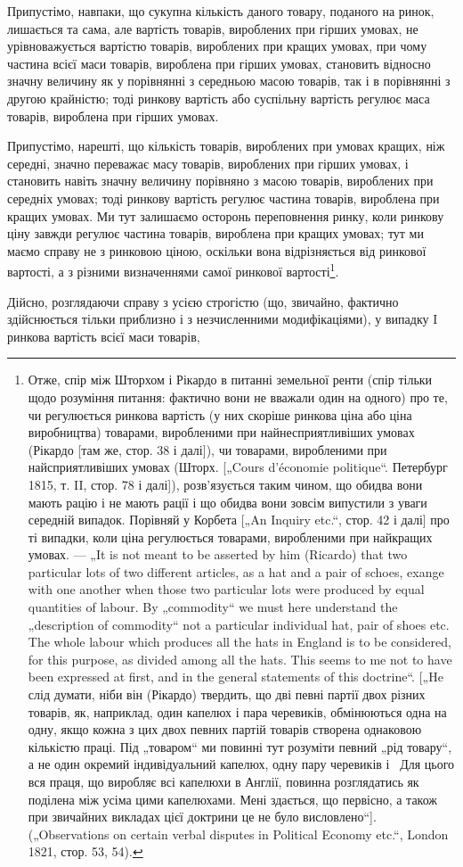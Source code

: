 Припустімо, навпаки, що сукупна кількість даного товару,
поданого на ринок, лишається та сама, але вартість товарів,
вироблених при гірших умовах, не урівноважується вартістю
товарів, вироблених при кращих умовах, при чому частина всієї
маси товарів, вироблена при гірших умовах, становить відносно
значну величину як у порівнянні з середньою масою товарів,
так і в порівнянні з другою крайністю; тоді ринкову вартість
або суспільну вартість регулює маса товарів, вироблена при
гірших умовах.

Припустімо, нарешті, що кількість товарів, вироблених при
умовах кращих, ніж середні, значно переважає масу товарів, вироблених при гірших умовах, і становить
навіть значну величину порівняно з масою товарів, вироблених при середніх умовах; тоді ринкову
вартість регулює частина товарів, вироблена при
кращих умовах. Ми тут залишаємо осторонь переповнення ринку,
коли ринкову ціну завжди регулює частина товарів, вироблена
при кращих умовах; тут ми маємо справу не з ринковою ціною,
оскільки вона відрізняється від ринкової вартості, а з різними
визначеннями самої ринкової вартості\footnote{
Отже, спір між Шторхом і Рікардо в питанні земельної ренти (спір
тільки щодо розуміння питання: фактично вони не вважали один на одного)
про те, чи регулюється ринкова вартість (у них скоріше ринкова ціна або
ціна виробництва) товарами, виробленими при найнесприятливіших умовах
(Рікардо [там же, стор. 38 і далі]), чи товарами, виробленими при найсприятливіших умовах (Шторх.
[„Cours d’économie politique“. Петербург 1815, т. II,
стор. 78 і далі]), розв’язується таким чином, що обидва вони мають рацію
і не мають рації і що обидва вони зовсім випустили з уваги середній випадок.
Порівняй у Корбета [„An Inquiry etc.“, стор. 42 і далі] про ті випадки, коли
ціна регулюється товарами, виробленими при найкращих умовах. — „It is not meant
to be asserted by him (Ricardo) that two particular lots of two different articles,
as a hat and a pair of schoes, exange with one another when those two particular
lots were produced by equal quantities of labour. By „commodity“ we must here
understand the „description of commodity“ not a particular individual hat, pair
of shoes etc. The whole labour which produces all the hats in England is to be
considered, for this purpose, as divided among all the hats. This seems to me not
to have been expressed at first, and in the general statements of this doctrine“. [„He
слід думати, ніби він (Рікардо) твердить, що дві певні партії двох різних товарів, як,
наприклад, один капелюх і пара черевиків, обмінюються одна на одну, якщо
кожна з цих двох певних партій товарів створена однаковою кількістю праці.
Під „товаром“ ми повинні тут розуміти певний „рід товару“, а не один окремий
індивідуальний капелюх, одну пару черевиків і~ Для цього вся праця, що виробляє всі капелюхи в
Англії, повинна розглядатись як поділена між усіма цими капелюхами. Мені здається, що первісно, а
також при звичайних викладах цієї
доктрини це не було висловлено“]. („Observations on certain verbal disputes in
Political Economy etc.“, London 1821, стор. 53, 54).
}.

Дійсно, розглядаючи справу з усією строгістю (що, звичайно,
фактично здійснюється тільки приблизно і з незчисленними модифікаціями), у випадку I ринкова
вартість всієї маси товарів,
\parbreak{}  %
